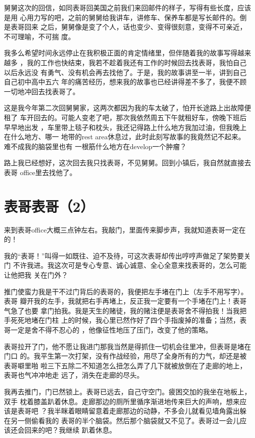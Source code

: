 \documentclass[12pt]{book}
\begin{document}
舅舅这次的回信，如同表哥回美国之前我们来回邮件的样子，写得有些长度，应该是用
心用力写的吧，之前的舅舅给我讲车，讲修车、保养车都是写长邮件的。倒是表哥回来
之后，舅舅像是变了个人，话也变少、变得很刻意，变得不可亲近，不可理喻，不可揣
度。

我多么希望时间永远停止在我积极正面的肯定情绪里，但伴随着我的故事写得越来越多
，我的工作也快结束，我若不趁着我还有工作的时候回去找表哥，我怕自己以后永远没
有勇气、没有机会再去找他了。于是，我的故事讲至一半，讲到自己自己初中高中五六
年的痛苦经历，想来我的故事也已经讲得差不多了，我便不顾一切地冲回去找表哥了。

这是我今年第二次回舅舅家，这两次都因为我的车太破了，怕开长途路上出故障便租了
车开回去的。可能人变老了吧，那次我依然周五下午就租好车，傍晚下班后早早地出发
，车里带上毯子和枕头，我还记得路上什么地方我加过油，但我晚上在什么地方、哪一
地带的rest area休息过，此时此刻写故事的我竟然记不起来。难不成我的脑袋里也有
一根筋什么地方在develop一个肿瘤？

路上我已经想好，这次回去我只找表哥，不见舅舅。回到小镇后，我自然就直接去表哥
office里去找他了。
\section{表哥表哥（2）}
\label{sec-9-97}

来到表哥office大概三点钟左右。我敲门，里面传来脚步声，我就知道表哥一定在的！

我的“表哥！”叫得一如既往、迫不及待，可这次表哥却传出哼哼声做足了架势要关门
不许我进。我这次可是专心专意、诚心诚意、全心全意来找表哥的，怎么可能让他把我
关在门外？

推门使蛮力我是干不过门背后的表哥的，我便把左手堵在门上（左手不用写字）。表哥
瓣开我的左手，我就把右手再堵上，反正我一定要有一个手堵在门上！表哥气急了也要
拿门拍我。我是天生的赌徒，我的赌注便是表哥舍不得拍我！当我把手死死地堵在门柱
上的时候，我心里已然作好了四个手指废掉的准备；当然，表哥一定是舍不得不忍心的
，他像征性地压了压门，改变了他的策略。

表哥拉开了门，他不愿让我进门那我当然是得抓住一切机会往里冲，但表哥是堵在门口
的。我平生第一次打架，没有作战经验，用尽了全身所有的力气，却还是被表哥噼里啪
啦三下五除二不知道怎么扭怎么弄了几下就被放倒在了走廊的地上，表哥也气冲冲地走
远了，消失在走廊的尽头。

我再去推门，门已然锁上。表哥已远去，自己守空门。疲困交加的我坐在地板上，双手
枕着膝盖趴着休息。走廊那边的厕所里循序渐进地传来巨大的声响，想来应该是表哥吧
？我半眯着眼睛留意着走廊那边的动静，不多会儿就看见墙角露出躲在另一侧偷看我的
表哥的半个脑袋。然后那个脑袋就又不见了。表哥过一会儿应该还会回来的吧？我继续
趴着休息。　
\end{document}
